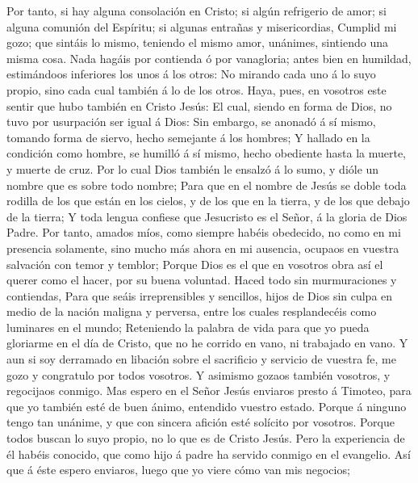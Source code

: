  Por tanto, si hay alguna consolación en Cristo; si algún
refrigerio de amor; si alguna comunión del Espíritu; si algunas entrañas
y misericordias,  Cumplid mi gozo; que sintáis lo mismo,
teniendo el mismo amor, unánimes, sintiendo una misma cosa. 
Nada hagáis por contienda ó por vanagloria; antes bien en humildad,
estimándoos inferiores los unos á los otros:  No mirando
cada uno á lo suyo propio, sino cada cual también á lo de los otros.
 Haya, pues, en vosotros este sentir que hubo también en
Cristo Jesús:  El cual, siendo en forma de Dios, no tuvo por
usurpación ser igual á Dios:  Sin embargo, se anonadó á sí
mismo, tomando forma de siervo, hecho semejante á los hombres;
 Y hallado en la condición como hombre, se humilló á sí
mismo, hecho obediente hasta la muerte, y muerte de cruz. 
Por lo cual Dios también le ensalzó á lo sumo, y dióle un nombre que es
sobre todo nombre;  Para que en el nombre de Jesús se doble
toda rodilla de los que están en los cielos, y de los que en la tierra,
y de los que debajo de la tierra;  Y toda lengua confiese
que Jesucristo es el Señor, á la gloria de Dios Padre.  Por
tanto, amados míos, como siempre habéis obedecido, no como en mi
presencia solamente, sino mucho más ahora en mi ausencia, ocupaos en
vuestra salvación con temor y temblor;  Porque Dios es el
que en vosotros obra así el querer como el hacer, por su buena voluntad.
 Haced todo sin murmuraciones y contiendas, 
Para que seáis irreprensibles y sencillos, hijos de Dios sin culpa en
medio de la nación maligna y perversa, entre los cuales resplandecéis
como luminares en el mundo;  Reteniendo la palabra de vida
para que yo pueda gloriarme en el día de Cristo, que no he corrido en
vano, ni trabajado en vano.  Y aun si soy derramado en
libación sobre el sacrificio y servicio de vuestra fe, me gozo y
congratulo por todos vosotros.  Y asimismo gozaos también
vosotros, y regocijaos conmigo.  Mas espero en el Señor
Jesús enviaros presto á Timoteo, para que yo también esté de buen ánimo,
entendido vuestro estado.  Porque á ninguno tengo tan
unánime, y que con sincera afición esté solícito por vosotros.
 Porque todos buscan lo suyo propio, no lo que es de Cristo
Jesús.  Pero la experiencia de él habéis conocido, que como
hijo á padre ha servido conmigo en el evangelio.  Así que á
éste espero enviaros, luego que yo viere cómo van mis negocios;
